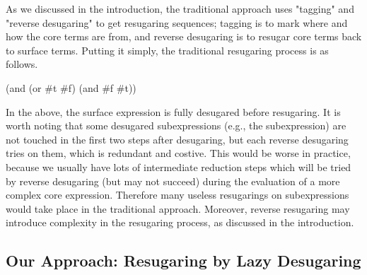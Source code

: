 As we discussed in the introduction, the traditional approach uses "tagging" and "reverse desugaring" to get resugaring sequences; tagging is to mark where and how the core terms are from, and reverse desugaring is to resugar core terms back to surface terms. Putting it simply, the traditional resugaring process is as follows.

\begin{Codes}
    (and (or \#t \#f) (and \#f \#t))
 
\end{Codes}

In the above, the surface expression is fully desugared before resugaring. It is worth noting that some desugared subexpressions (e.g., the  subexpression) are not touched in the first two steps after desugaring, but each reverse desugaring tries on them, which is redundant and costive. This would be worse in practice, because we usually have lots of intermediate reduction steps which will be tried by reverse desugaring (but  may not succeed) during the evaluation of a more complex core expression. Therefore many useless resugarings on subexpressions would take place in the traditional approach. Moreover, reverse resugaring may introduce complexity in the resugaring process, as discussed in the introduction.

\subsection{Our Approach: Resugaring by Lazy Desugaring}

